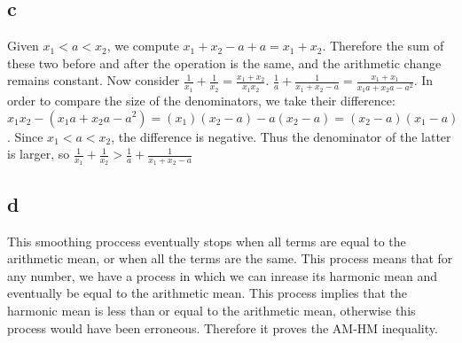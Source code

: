 \documentclass[12pt]{article}
\begin{document}
\subsection{c}
Given $x_1<a<x_2$, we compute $x_1+x_2-a+a = x_1+x_2$. Therefore the sum of these two before and after the operation is the same, and the arithmetic change remains constant.
\newline
Now consider $\frac{1}{x_1}+\frac{1}{x_2} = \frac{x_1+x_2}{x_1x_2}$. $\frac{1}{a}+\frac{1}{x_1+x_2-a} = \frac{x_1+x_1}{x_1a+x_2a-a^2}$. In order to compare the size of the denominators, we take their difference: $x_1x_2 -(x_1a+x_2a-a^2) = (x_1)(x_2-a) - a(x_2-a) = (x_2-a)(x_1-a) $. Since $x_1<a<x_2$, the difference is negative.
Thus the denominator of the latter is larger, so $\frac{1}{x_1}+\frac{1}{x_2}>\frac{1}{a}+\frac{1}{x_1+x_2-a}$

\subsection{d}
This smoothing proccess eventually stops when all terms are equal to the arithmetic mean, or when all the terms are the same. This process means that for any number, we have a process in which we can inrease its harmonic mean and eventually be equal to the arithmetic mean.
This process implies that the harmonic mean is less than or equal to the arithmetic mean, otherwise this process would have been erroneous. Therefore it proves the AM-HM inequality.
\end{document}
